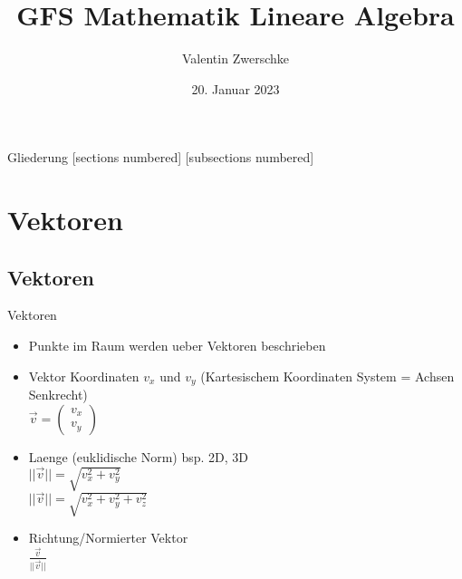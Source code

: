\documentclass[10pt,aspectratio=169]{beamer}
\title{GFS Mathematik Lineare Algebra}
\date{20. Januar 2023}
\author{Valentin Zwerschke}
\institute{Königin-Olga-Stift Gymnasium}
\begin{document}
  \maketitle

  \begin{frame}{Gliederung}
	[sections numbered]
	[subsections numbered]
	\tableofcontents[hideallsubsections]
  \end{frame}

  \section{Vektoren}
  \subsection{Vektoren}
  \begin{frame}{Vektoren}
    \begin{minipage}{0.65\textwidth}
      \begin{itemize}
        \item Punkte im Raum werden ueber Vektoren beschrieben 
        \item Vektor Koordinaten $v_x$ und $v_y$ (Kartesischem Koordinaten System = Achsen Senkrecht)\\\vspace{0.2cm} 
        \hspace{0.3cm}$\vec{v} = \begin{pmatrix} v_x\\ v_y\end{pmatrix}$
        \vspace{0.2cm}
        \item Laenge (euklidische Norm) bsp. 2D, 3D\\
        \hspace{0.3cm}$||\vec{v}|| =  \sqrt{v_x^2 + v_y^2}$\\
        \hspace{0.3cm}$||\vec{v}|| =  \sqrt{v_x^2 + v_y^2 + v_z^2}$
        \vspace{0.2cm}
        \item Richtung/Normierter Vektor\\
        \hspace{0.25cm}\Large$\frac{\vec{v}}{||\vec{v}||}$
      \end{itemize}  
    \end{minipage}
    \begin{minipage}[c]{0.3\textwidth}
    \end{minipage}
  \end{frame}
\end{document}
